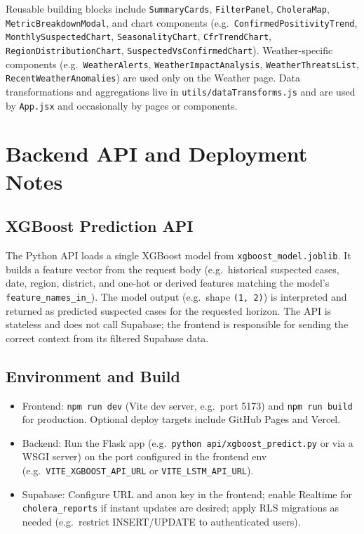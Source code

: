 \documentclass[11pt,a4paper]{article}
\begin{document}
Reusable building blocks include \texttt{SummaryCards}, \texttt{FilterPanel}, \texttt{CholeraMap}, \texttt{MetricBreakdownModal}, and chart components (e.g.\ \texttt{ConfirmedPositivityTrend}, \texttt{MonthlySuspectedChart}, \texttt{SeasonalityChart}, \texttt{CfrTrendChart}, \texttt{RegionDistributionChart}, \texttt{SuspectedVsConfirmedChart}). Weather-specific components (e.g.\ \texttt{WeatherAlerts}, \texttt{WeatherImpactAnalysis}, \texttt{WeatherThreatsList}, \texttt{RecentWeatherAnomalies}) are used only on the Weather page. Data transformations and aggregations live in \texttt{utils/dataTransforms.js} and are used by \texttt{App.jsx} and occasionally by pages or components.

\newpage

\section{Backend API and Deployment Notes}

\subsection{XGBoost Prediction API}

The Python API loads a single XGBoost model from \texttt{xgboost\_model.joblib}. It builds a feature vector from the request body (e.g.\ historical suspected cases, date, region, district, and one-hot or derived features matching the model’s \texttt{feature\_names\_in\_}). The model output (e.g.\ shape \texttt{(1, 2)}) is interpreted and returned as predicted suspected cases for the requested horizon. The API is stateless and does not call Supabase; the frontend is responsible for sending the correct context from its filtered Supabase data.

\subsection{Environment and Build}

\begin{itemize}[noitemsep]
    \item Frontend: \texttt{npm run dev} (Vite dev server, e.g.\ port 5173) and \texttt{npm run build} for production. Optional deploy targets include GitHub Pages and Vercel.
    \item Backend: Run the Flask app (e.g.\ \texttt{python api/xgboost\_predict.py} or via a WSGI server) on the port configured in the frontend env (e.g.\ \texttt{VITE\_XGBOOST\_API\_URL} or \texttt{VITE\_LSTM\_API\_URL}).
    \item Supabase: Configure URL and anon key in the frontend; enable Realtime for \texttt{cholera\_reports} if instant updates are desired; apply RLS migrations as needed (e.g.\ restrict INSERT/UPDATE to authenticated users).
\end{itemize}
\end{document}
